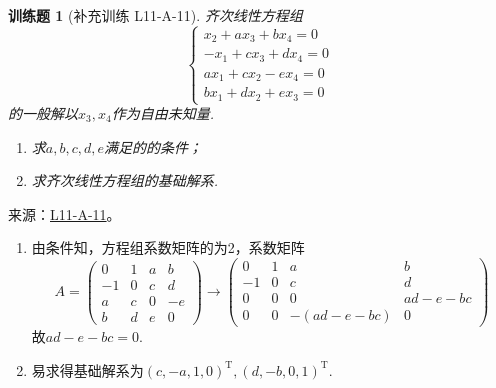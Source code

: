 \documentclass[UTF8,12pt,a4paper,fontset=fandol]{ctexart}
\newtheorem{exercise}{训练题}[section]
\begin{document}
\begin{exercise}[补充训练 L11-A-11]\label{prob:L11-A-11}
齐次线性方程组\[\begin{cases}
                x_2+ax_3+bx_4=0  \\
                -x_1+cx_3+dx_4=0 \\
                ax_1+cx_2-ex_4=0 \\
                bx_1+dx_2+ex_3=0
            \end{cases}\]的一般解以$x_3,x_4$作为自由未知量.
        \begin{enumerate}
            \item 求$a,b,c,d,e$满足的的条件；

            \item 求齐次线性方程组的基础解系.
        \end{enumerate}
\end{exercise}
\noindent 来源：\href{https://github.com/yhwu-is/Linear-Algebra-Left-Undone/blob/new/%E8%AE%B2%E4%B9%89/%E4%B8%93%E9%A2%98/11%20%E6%9C%9D%E8%8A%B1%E5%A4%95%E6%8B%BE.tex}{L11-A-11}。
\begin{solve}
\begin{enumerate}
                \item 由条件知，方程组系数矩阵的为2，系数矩阵
                      \[ A=\begin{pmatrix}
                              0  & 1 & a & b  \\
                              -1 & 0 & c & d  \\
                              a  & c & 0 & -e \\
                              b  & d & e & 0
                          \end{pmatrix}\rightarrow
                          \begin{pmatrix}
                              0  & 1 & a          & b       \\
                              -1 & 0 & c          & d       \\
                              0  & 0 & 0          & ad-e-bc \\
                              0  & 0 & -(ad-e-bc) & 0
                          \end{pmatrix} \]
                      故$ad-e-bc=0$.

                \item 易求得基础解系为$(c,-a,1,0)^\mathrm{T},(d,-b,0,1)^\mathrm{T}$.
            \end{enumerate}
\end{solve}
\end{document}
